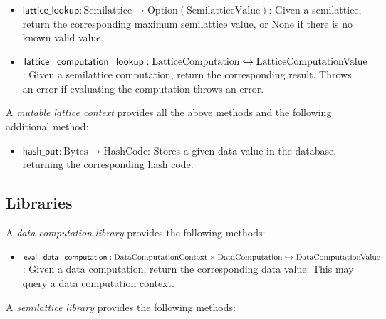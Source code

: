 \documentclass{article}
\begin{document}
      \newcommand{\latticelookup}{\ensuremath{\mathsf{lattice\_lookup}}}
      \newcommand{\latticecomputationlookup}{\ensuremath{\mathsf{lattice\_computation\_lookup}}}

      \begin{itemize}
        \item $\latticelookup : \mathrm{Semilattice} \to \mathrm{Option}(\mathrm{SemilatticeValue})$: Given a semilattice, return the corresponding maximum semilattice value, or $\mathrm{None}$ if there is no known valid value.
        \item $\latticecomputationlookup : \mathrm{LatticeComputation} \partialto \mathrm{LatticeComputationValue}$: Given a semilattice computation, return the corresponding result. Throws an error if evaluating the computation throws an error.
      \end{itemize}

      A \emph{mutable lattice context} provides all the above methods and the following additional method:

      \newcommand{\hashput}{\ensuremath{\mathsf{hash\_put}}}

      \begin{itemize}
        \item $\hashput : \mathrm{Bytes} \to \mathrm{HashCode}$: Stores a given data value in the database, returning the corresponding hash code.
      \end{itemize}

    \subsection{Libraries}

      A \emph{data computation library} provides the following methods:

      \newcommand{\evaldatacomputation}{\ensuremath{\mathsf{eval\_data\_computation}}}

      \begin{itemize}
        \item $\evaldatacomputation : \mathrm{DataComputationContext} \times \mathrm{DataComputation} \partialto \mathrm{DataComputationValue}$: Given a data computation, return the corresponding data value. This may query a data computation context.
      \end{itemize}

      A \emph{semilattice library} provides the following methods:

      \newcommand{\transport}{\ensuremath{\mathsf{transport}}}
      \newcommand{\evallatticecomputation}{\ensuremath{\mathsf{eval\_lattice\_computation}}}
\end{document}

